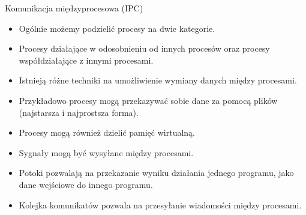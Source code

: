 \documentclass[notheorems, aspectratio=54]{beamer}
\begin{document}
\begin{frame}
Komunikacja międzyprocesowa (IPC)

\begin{itemize}
\item Ogólnie możemy podzielić procesy na dwie kategorie.
\item Procesy działające w odosobnieniu od innych procesów oraz procesy współdziałające z innymi procesami.
\item Istnieją różne techniki na umożliwienie wymiany danych między procesami.
\item Przykładowo procesy mogą przekazywać sobie dane za pomocą plików (najstarsza i najprostsza forma).
\item Procesy mogą również dzielić pamięć wirtualną.
\item Sygnały mogą być wysyłane między procesami.
\item Potoki pozwalają na przekazanie wyniku działania jednego programu, jako dane wejściowe do innego programu.
\item Kolejka komunikatów pozwala na przesyłanie wiadomości między procesami.
\end{itemize}

\end{frame}
\end{document}
